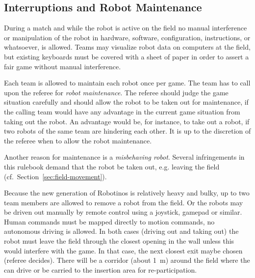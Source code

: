 \documentclass[12pt,twoside]{article}
\newcommand{\refsec}[1]{Section~\ref{#1}}
\begin{document}

\subsection{Interruptions and Robot Maintenance}
\label{sec:robot-maintenance}
During a match and while the robot is active on the field no manual
interference or manipulation of the robot in hardware, software,
configuration, instructions, or whatsoever, is allowed.  Teams may
visualize robot data on computers at the field, but existing keyboards
must be covered with a sheet of paper in order to assert a fair game
without manual interference.


Each team is allowed to maintain each robot once per game. The team
has to call upon the referee for \textit{robot maintenance}.  The
referee should judge the game situation carefully and should allow the
robot to be taken out for maintenance, if the calling team would have
any advantage in the current game situation from taking out the
robot. An advantage would be, for instance, to take out a robot, if
two robots of the same team are hindering each other. It is up to the
discretion of the referee when to allow the robot maintenance.

Another reason for maintenance is a \emph{misbehaving robot}. Several
infringements in this rulebook demand that the robot be taken out,
e.g. leaving the field (cf.~\refsec{sec:field-movement}).

Because the new generation of Robotinos is relatively heavy and bulky,
up to two team members are allowed to remove a robot from the field.
Or the robots may be driven out manually by remote control using a
joystick, gamepad or similar. Human commands must be mapped directly
to motion commands, no autonomous driving is allowed. In both cases
(driving out and taking out) the robot must leave the field through
the closest opening in the wall unless this would interfere with the
game. In that case, the next closest exit maybe chosen (referee
decides). There will be a corridor (about \SI{1}{\metre}) around the
field where the can drive or be carried to the insertion area for
re-participation.
\end{document}
